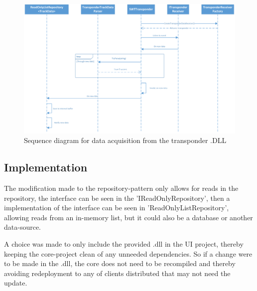 \begin{figure}
	\centering
	\includegraphics[width=1.0\linewidth]{Images/SWTTransponder}
	\caption{Sequence diagram for data acquisition from the transponder .DLL}
	\label{fig:SWTTransponderSeq}
\end{figure}

\subsection{Implementation}

The modification made to the repository-pattern only allows for reads in the repository, the interface can be seen in the 'IReadOnlyRepository', then a implementation of the interface can be seen in 'ReadOnlyListRepository', allowing reads from an in-memory list, but it could also be a database or another data-source.

A choice was made to only include the provided .dll in the UI project, thereby keeping the core-project clean of any unneeded dependencies. So if a change were to be made in the .dll, the core does not need to be recompiled and thereby avoiding redeployment to any of clients distributed that may not need the update. 

\clearpage
